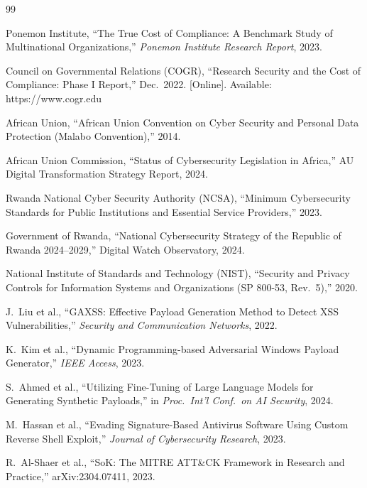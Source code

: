 \documentclass[11pt,conference]{IEEEtran}
\begin{document}

\begin{thebibliography}{99}

Ponemon Institute, ``The True Cost of Compliance: A Benchmark Study of Multinational Organizations,'' \textit{Ponemon Institute Research Report}, 2023.

Council on Governmental Relations (COGR), ``Research Security and the Cost of Compliance: Phase I Report,'' Dec.\ 2022. [Online]. Available: https://www.cogr.edu

African Union, ``African Union Convention on Cyber Security and Personal Data Protection (Malabo Convention),'' 2014.

African Union Commission, ``Status of Cybersecurity Legislation in Africa,'' AU Digital Transformation Strategy Report, 2024.

Rwanda National Cyber Security Authority (NCSA), ``Minimum Cybersecurity Standards for Public Institutions and Essential Service Providers,'' 2023.

Government of Rwanda, ``National Cybersecurity Strategy of the Republic of Rwanda 2024--2029,'' Digital Watch Observatory, 2024.

National Institute of Standards and Technology (NIST), ``Security and Privacy Controls for Information Systems and Organizations (SP 800-53, Rev.\ 5),'' 2020.

J.\ Liu et al., ``GAXSS: Effective Payload Generation Method to Detect XSS Vulnerabilities,'' \textit{Security and Communication Networks}, 2022.

K.\ Kim et al., ``Dynamic Programming-based Adversarial Windows Payload Generator,'' \textit{IEEE Access}, 2023.

S.\ Ahmed et al., ``Utilizing Fine-Tuning of Large Language Models for Generating Synthetic Payloads,'' in \textit{Proc.\ Int'l Conf.\ on AI Security}, 2024.

M.\ Hassan et al., ``Evading Signature-Based Antivirus Software Using Custom Reverse Shell Exploit,'' \textit{Journal of Cybersecurity Research}, 2023.

R.\ Al-Shaer et al., ``SoK: The MITRE ATT\&CK Framework in Research and Practice,'' arXiv:2304.07411, 2023.


\end{thebibliography}
\end{document}
